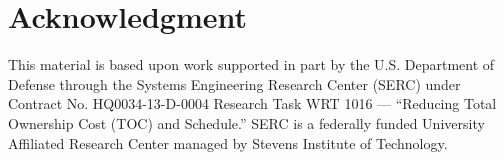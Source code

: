 \section*{Acknowledgment}
This material is based upon work supported in part by the U.S. Department of Defense through the Systems Engineering Research Center (SERC) under Contract No. HQ0034-13-D-0004 Research Task WRT 1016 --- ``Reducing Total Ownership Cost (TOC) and Schedule.'' SERC is a federally funded University Affiliated Research Center managed by Stevens Institute of Technology. 